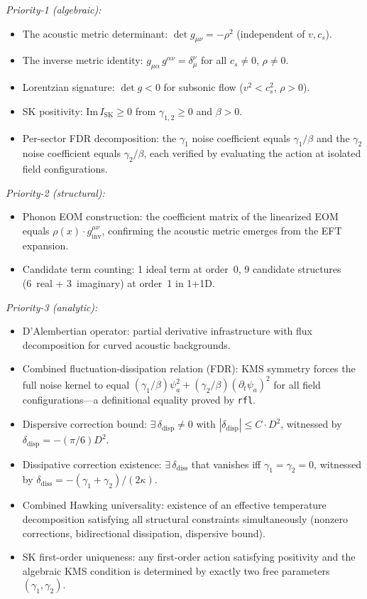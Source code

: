 \documentclass[aps,prl,twocolumn,superscriptaddress,nofootinbib,amsmath,amssymb]{revtex4-2}
\begin{document}
\textit{Priority-1 (algebraic):}
\begin{itemize}
\item The acoustic metric determinant: $\det g_{\mu\nu} = -\rho^2$ (independent of $v, c_s$).
\item The inverse metric identity: $g_{\mu\alpha}\, g^{\alpha\nu} = \delta^\nu_\mu$ for all $c_s \neq 0$, $\rho \neq 0$.
\item Lorentzian signature: $\det g < 0$ for subsonic flow ($v^2 < c_s^2$, $\rho > 0$).
\item SK positivity: $\mathrm{Im}\, I_{\text{SK}} \geq 0$ from $\gamma_{1,2} \geq 0$ and $\beta > 0$.
\item Per-sector FDR decomposition: the $\gamma_1$ noise coefficient equals $\gamma_1/\beta$ and the $\gamma_2$ noise coefficient equals $\gamma_2/\beta$, each verified by evaluating the action at isolated field configurations.
\end{itemize}

\textit{Priority-2 (structural):}
\begin{itemize}
\item Phonon EOM construction: the coefficient matrix of the linearized EOM equals $\rho(x) \cdot g^{\mu\nu}_{\text{inv}}$, confirming the acoustic metric emerges from the EFT expansion.
\item Candidate term counting: 1 ideal term at order~0, 9 candidate structures (6~real + 3~imaginary) at order~1 in 1+1D.
\end{itemize}

\textit{Priority-3 (analytic):}
\begin{itemize}
\item D'Alembertian operator: partial derivative infrastructure with flux decomposition for curved acoustic backgrounds.
\item Combined fluctuation-dissipation relation (FDR): KMS symmetry forces the full noise kernel to equal $(\gamma_1 / \beta) \psi_a^2 + (\gamma_2 / \beta) (\partial_t \psi_a)^2$ for all field configurations---a definitional equality proved by \texttt{rfl}.
\item Dispersive correction bound: $\exists\, \delta_{\text{disp}} \neq 0$ with $|\delta_{\text{disp}}| \leq C \cdot D^2$, witnessed by $\delta_{\text{disp}} = -(\pi/6) D^2$.
\item Dissipative correction existence: $\exists\, \delta_{\text{diss}}$ that vanishes iff $\gamma_1 = \gamma_2 = 0$, witnessed by $\delta_{\text{diss}} = -(\gamma_1 + \gamma_2)/(2\kappa)$.
\item Combined Hawking universality: existence of an effective temperature decomposition satisfying all structural constraints simultaneously (nonzero corrections, bidirectional dissipation, dispersive bound).
\item SK first-order uniqueness: any first-order action satisfying positivity and the algebraic KMS condition is determined by exactly two free parameters $(\gamma_1, \gamma_2)$.
\end{itemize}
\end{document}
